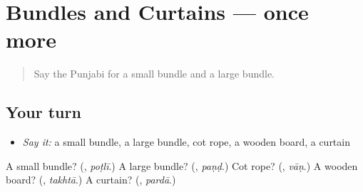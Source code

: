 \section[(dialogue)]{Bundles and Curtains — once more}

\label{lesson:PA-R252-review-final-252}



\begin{quote}
Say the Punjabi for a small bundle and a large bundle.
\end{quote}

\subsection*{Your turn}
\begin{itemize}
\raggedright
  \item \emph{Say it:} a small bundle, a large bundle, cot rope, a wooden board, a curtain
\end{itemize}

\begin{tcolorbox}[breakable,colback=teal!4,colframe=teal!35!black,title={Before you move on}]
A small bundle? (\textbf{}, \emph{poṭlī}.) A large bundle? (\textbf{}, \emph{paṇḍ}.) Cot rope? (\textbf{}, \emph{vāṇ}.) A wooden board? (\textbf{}, \emph{takhtā}.) A curtain? (\textbf{}, \emph{pardā}.)
\end{tcolorbox}
